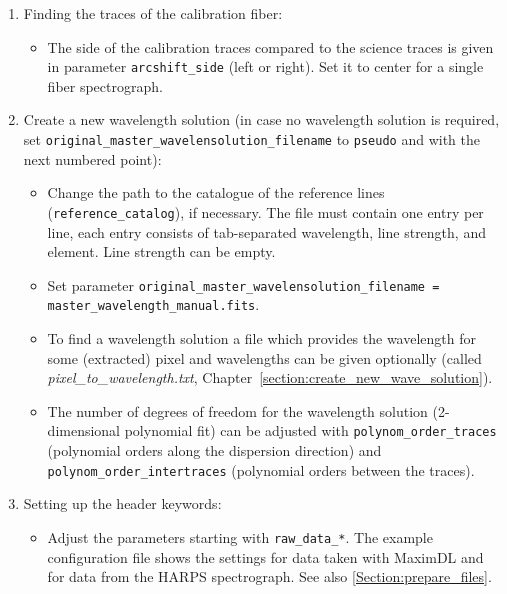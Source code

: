 \documentclass[10pt,a4paper]{article}
\begin{document}
\begin{enumerate}
  \item Finding the traces of the calibration fiber: \vspace*{-\itemsep}
  \begin{itemize}[leftmargin=*]\setlength\itemsep{0em}
    \item The side of the calibration traces compared to the science traces is given in parameter \verb|arcshift_side| (left or right). Set it to center for a single fiber spectrograph.
  \end{itemize}
  
  \item Create a new wavelength solution (in case no wavelength solution is required, set \verb|original_master_wavelensolution_filename| to \verb|pseudo| and with the next numbered point): \vspace*{-\itemsep}
  \begin{itemize}[leftmargin=*]\setlength\itemsep{0em}
    \item Change the path to the catalogue of the reference lines (\verb|reference_catalog|), if necessary. The file must contain one entry per line, each entry consists of tab-separated wavelength, line strength, and element. Line strength can be empty.
    \item Set parameter \verb|original_master_wavelensolution_filename =| \\
          \verb|master_wavelength_manual.fits|.
    \item To find a wavelength solution a file which provides the wavelength for some (extracted) pixel and wavelengths can be given optionally (called \textit{pixel\_to\_wavelength.txt}, Chapter~\ref{section:create_new_wave_solution}).
    \item The number of degrees of freedom for the wavelength solution (2-dimensional polynomial fit) can be adjusted with \verb|polynom_order_traces| (polynomial orders along the dispersion direction) and \verb|polynom_order_intertraces| (polynomial orders between the traces).
  \end{itemize}
  
  \item Setting up the header keywords: \vspace*{-\itemsep}
  \begin{itemize}[leftmargin=*]\setlength\itemsep{0em}
    \item Adjust the parameters starting with \verb|raw_data_*|. The example configuration file shows the settings for data taken with MaximDL and for data from the HARPS spectrograph. See also \ref{Section:prepare_files}.
  \end{itemize}
     

\end{enumerate}
\end{document}
